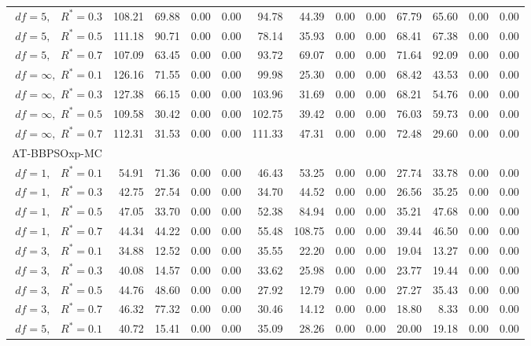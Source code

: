 \documentclass[12pt]{article}
\begin{document}
\begin{appendix}
\begin{table}[ht]
{\begin{tabular}{r|rrrr|rrrr|rrrr}
  $df = 5,\enspace$ $R^* =0.3$ & 108.21 & 69.88 & 0.00 & 0.00 & 94.78 & 44.39 & 0.00 & 0.00 & 67.79 & 65.60 & 0.00 & 0.00 \\ 
  $df = 5,\enspace$ $R^* =0.5$ & 111.18 & 90.71 & 0.00 & 0.00 & 78.14 & 35.93 & 0.00 & 0.00 & 68.41 & 67.38 & 0.00 & 0.00 \\ 
  $df = 5,\enspace$ $R^* =0.7$ & 107.09 & 63.45 & 0.00 & 0.00 & 93.72 & 69.07 & 0.00 & 0.00 & 71.64 & 92.09 & 0.00 & 0.00 \\ 
  $df = \infty,$ $R^* =0.1$ & 126.16 & 71.55 & 0.00 & 0.00 & 99.98 & 25.30 & 0.00 & 0.00 & 68.42 & 43.53 & 0.00 & 0.00 \\ 
  $df = \infty,$ $R^* =0.3$ & 127.38 & 66.15 & 0.00 & 0.00 & 103.96 & 31.69 & 0.00 & 0.00 & 68.21 & 54.76 & 0.00 & 0.00 \\ 
  $df = \infty,$ $R^* =0.5$ & 109.58 & 30.42 & 0.00 & 0.00 & 102.75 & 39.42 & 0.00 & 0.00 & 76.03 & 59.73 & 0.00 & 0.00 \\ 
  $df = \infty,$ $R^* =0.7$ & 112.31 & 31.53 & 0.00 & 0.00 & 111.33 & 47.31 & 0.00 & 0.00 & 72.48 & 29.60 & 0.00 & 0.00 \\ 
\hline
\multicolumn{1}{l|}{AT-BBPSOxp-MC} &&&&&&&&&&&&\\
  $df = 1,\enspace$ $R^* =0.1$ & 54.91 & 71.36 & 0.00 & 0.00 & 46.43 & 53.25 & 0.00 & 0.00 & 27.74 & 33.78 & 0.00 & 0.00 \\ 
  $df = 1,\enspace$ $R^* =0.3$ & 42.75 & 27.54 & 0.00 & 0.00 & 34.70 & 44.52 & 0.00 & 0.00 & 26.56 & 35.25 & 0.00 & 0.00 \\ 
  $df = 1,\enspace$ $R^* =0.5$ & 47.05 & 33.70 & 0.00 & 0.00 & 52.38 & 84.94 & 0.00 & 0.00 & 35.21 & 47.68 & 0.00 & 0.00 \\ 
  $df = 1,\enspace$ $R^* =0.7$ & 44.34 & 44.22 & 0.00 & 0.00 & 55.48 & 108.75 & 0.00 & 0.00 & 39.44 & 46.50 & 0.00 & 0.00 \\ 
  $df = 3,\enspace$ $R^* =0.1$ & 34.88 & 12.52 & 0.00 & 0.00 & 35.55 & 22.20 & 0.00 & 0.00 & 19.04 & 13.27 & 0.00 & 0.00 \\ 
  $df = 3,\enspace$ $R^* =0.3$ & 40.08 & 14.57 & 0.00 & 0.00 & 33.62 & 25.98 & 0.00 & 0.00 & 23.77 & 19.44 & 0.00 & 0.00 \\ 
  $df = 3,\enspace$ $R^* =0.5$ & 44.76 & 48.60 & 0.00 & 0.00 & 27.92 & 12.79 & 0.00 & 0.00 & 27.27 & 35.43 & 0.00 & 0.00 \\ 
  $df = 3,\enspace$ $R^* =0.7$ & 46.32 & 77.32 & 0.00 & 0.00 & 30.46 & 14.12 & 0.00 & 0.00 & 18.80 & 8.33 & 0.00 & 0.00 \\ 
  $df = 5,\enspace$ $R^* =0.1$ & 40.72 & 15.41 & 0.00 & 0.00 & 35.09 & 28.26 & 0.00 & 0.00 & 20.00 & 19.18 & 0.00 & 0.00 \\ 

\end{tabular}}
\end{table}
\end{appendix}
\end{document}
